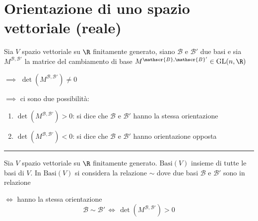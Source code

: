 
\section{Orientazione di uno spazio vettoriale (reale)}

Sia $ V $ spazio vettoriale su $ \R $ finitamente generato, siano $ \mathscr{B} $ e $ \mathscr{B}' $ due basi e sia $ M^{ \mathscr{B}, \mathscr{B}'} $ la matrice del cambiamento di base $  M^{ \mathscr{B}, \mathscr{B}'} \in \text{GL}(n,\R) $ 

$\implies$ $ \det ( M^{ \mathscr{B}, \mathscr{B}'})\neq 0 $ 

$\implies$ ci sono due possibilità: \begin{enumerate}
    \item $ \det ( M^{ \mathscr{B}, \mathscr{B}'})>0 $: si dice che $ \mathscr{B} $ e $ \mathscr{B}' $ hanno la stessa orientazione
    \item $ \det ( M^{ \mathscr{B}, \mathscr{B}'})<0 $: si dice che $ \mathscr{B} $ e $ \mathscr{B}' $ hanno orientazione opposta
\end{enumerate}


\rule{7em}{.4pt}

Sia $ V $ spazio vettoriale su $ \R $ finitamente generato. $ \text{Basi}(V)$ insieme di tutte le basi di $ V $.
In $ \text{Basi}(V) $ si considera la relazione $ \sim $ dove due basi $ \mathscr{B} $ e $ \mathscr{B}' $ sono in relazione 

$ \iff $ hanno la stessa orientazione
\[
    \mathscr{B}\sim \mathscr{B}'\,\iff\, \det ( M^{ \mathscr{B}, \mathscr{B}'})>0
\]

